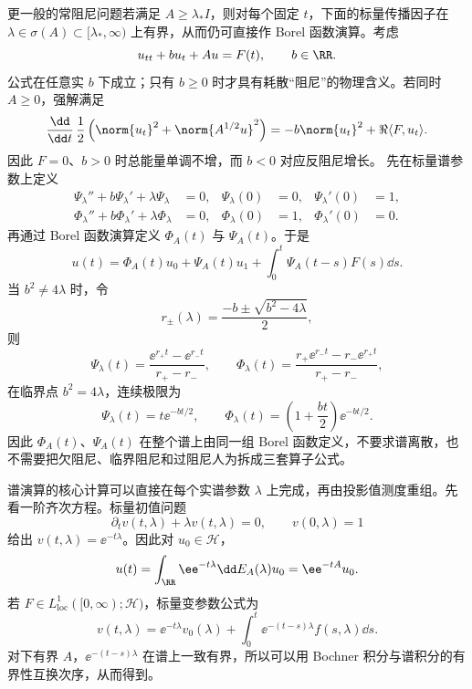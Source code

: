 更一般的常阻尼问题若满足 $A\ge \lambda_*I$，则对每个固定 $t$，下面的标量传播因子在 $\lambda\in\sigma(A)\subset[\lambda_*,\infty)$ 上有界，从而仍可直接作 Borel 函数演算。考虑
\[
 u_{tt}+b u_t+Au=F(t),\qquad b\in\RR.
\]
公式在任意实 $b$ 下成立；只有 $b\ge0$ 时才具有耗散“阻尼”的物理含义。若同时 $A\ge0$，强解满足
\begin{equation*}\frac{\dd}{\dd t}\,
 \frac12\left(\norm{u_t}^2+\norm{A^{1/2}u}^2\right)
 =-b\norm{u_t}^2+\Re\langle F,u_t\rangle.
\end{equation*}
因此 $F=0$、$b>0$ 时总能量单调不增，而 $b<0$ 对应反阻尼增长。
先在标量谱参数上定义
\begin{align}
 \Psi_\lambda''+b\Psi_\lambda'+\lambda\Psi_\lambda&=0,
 &\Psi_\lambda(0)&=0,&\Psi_\lambda'(0)&=1,
 \label{eq:math-sl-psi-lambda-def}\\
 \Phi_\lambda''+b\Phi_\lambda'+\lambda\Phi_\lambda&=0,
 &\Phi_\lambda(0)&=1,&\Phi_\lambda'(0)&=0.
 \label{eq:math-sl-phi-lambda-def}
\end{align}
再通过 Borel 函数演算定义 $\Phi_A(t)$ 与 $\Psi_A(t)$。于是
\begin{equation}\label{eq:math-sl-abstract-second-order-formal}
 u(t)=\Phi_A(t)u_0+\Psi_A(t)u_1+
 \int_0^t\Psi_A(t-s)F(s)\dd s.
\end{equation}
当 $b^2\neq4\lambda$ 时，令
\[
 r_\pm(\lambda)=\frac{-b\pm\sqrt{b^2-4\lambda}}{2},
\]
则
\begin{equation*}\Psi_\lambda(t)=\frac{\ee^{r_+t}-\ee^{r_-t}}{r_+-r_-},
 \qquad
 \Phi_\lambda(t)=\frac{r_+\ee^{r_-t}-r_-\ee^{r_+t}}{r_+-r_-},
\end{equation*}
在临界点 $b^2=4\lambda$，连续极限为
\[
 \Psi_\lambda(t)=t\ee^{-bt/2},
 \qquad
 \Phi_\lambda(t)=\left(1+\frac{bt}{2}\right)\ee^{-bt/2}.
\]
因此 $\Phi_A(t)$、$\Psi_A(t)$ 在整个谱上由同一组 Borel 函数定义，不要求谱离散，也不需要把欠阻尼、临界阻尼和过阻尼人为拆成三套算子公式。

谱演算的核心计算可以直接在每个实谱参数 $\lambda$ 上完成，再由投影值测度重组。先看一阶齐次方程。标量初值问题
\[
 \partial_t v(t,\lambda)+\lambda v(t,\lambda)=0,
 \qquad
 v(0,\lambda)=1
\]
给出 $v(t,\lambda)=\ee^{-t\lambda}$。因此对 $u_0\in\mathcal H$，
\[
 u(t)=\int_{\RR}\ee^{-t\lambda}\dd E_A(\lambda)u_0
 =\ee^{-tA}u_0.
\]
若 $F\in L^1_{\mathrm{loc}}([0,\infty);\mathcal H)$，标量变参数公式为
\[
 v(t,\lambda)
 =\ee^{-t\lambda}v_0(\lambda)
 +\int_0^t\ee^{-(t-s)\lambda}f(s,\lambda)\dd s.
\]
对下有界 $A$，$\ee^{-(t-s)\lambda}$ 在谱上一致有界，所以可以用 Bochner 积分与谱积分的有界性互换次序，从而得到。

